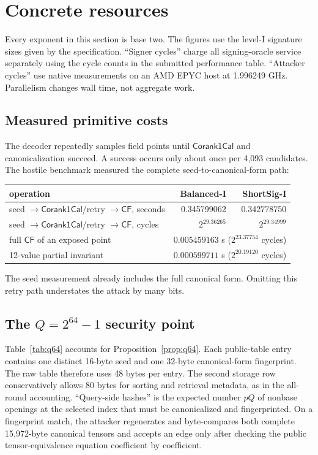 \documentclass[11pt,a4paper]{article}
\newcommand{\CF}{\mathsf{CF}}
\newcommand{\Corank}{\mathsf{Corank1Cal}}
\begin{document}
\section{Concrete resources}

Every exponent in this section is base two.  The figures use the level-I
signature sizes given by the specification.  ``Signer cycles'' charge all signing-oracle service
separately using the cycle counts in the submitted performance table.
``Attacker cycles'' use native measurements on an AMD EPYC host at 1.996249
GHz.  Parallelism changes wall time, not aggregate work.

\subsection{Measured primitive costs}

The decoder repeatedly samples field points until $\Corank$ and canonicalization
succeed.  A success occurs only about once per 4,093 candidates.  The hostile
benchmark measured the complete seed-to-canonical-form path:
\begin{center}
\small
\begin{tabular}{lrr}
\toprule
operation & Balanced-I & ShortSig-I\\
\midrule
seed $\rightarrow\Corank$/retry $\rightarrow\CF$, seconds &
  0.345799062 & 0.342778750\\
seed $\rightarrow\Corank$/retry $\rightarrow\CF$, cycles &
  $2^{29.36265}$ & $2^{29.34999}$\\
full $\CF$ of an exposed point & \multicolumn{2}{c}{$0.005459163$ s
  ($2^{23.37754}$ cycles)}\\
12-value partial invariant & \multicolumn{2}{c}{$0.000599711$ s
  ($2^{20.19120}$ cycles)}\\
\bottomrule
\end{tabular}
\end{center}
The seed measurement already includes the full canonical form.  Omitting this
retry path understates the attack by many bits.

\subsection{The \texorpdfstring{$Q=2^{64}-1$}{Q below 2 to the 64} security point}

Table~\ref{tab:q64} accounts for Proposition~\ref{prop:q64}.  Each public-table
entry contains one distinct 16-byte seed and one 32-byte canonical-form
fingerprint.  The raw table therefore uses 48 bytes per entry.  The second
storage row conservatively allows 80 bytes for sorting and retrieval metadata,
as in the all-round accounting.  ``Query-side hashes'' is the expected number
$pQ$ of nonbase openings at the selected index that must be canonicalized and
fingerprinted.  On a fingerprint match, the attacker regenerates and
byte-compares both complete 15,972-byte canonical tensors and accepts an edge
only after checking the public tensor-equivalence equation coefficient by
coefficient.
\end{document}
